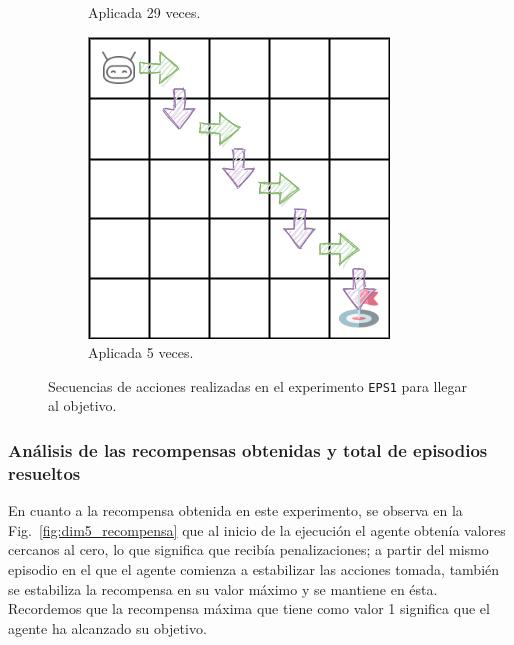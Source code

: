 \begin{figure}
\begin{subfigure}{.5\textwidth}
        \caption{Aplicada 29 veces.}
        \label{fig:dim5_actions_29}
    \end{subfigure}%
    \begin{subfigure}{.5\textwidth}
        \centering
        \includegraphics[scale=0.4]{cap5_experimentacion/images/dim5_actions_5.png}
        \caption{Aplicada 5 veces.}
        \label{fig:dim5_actions_5}
    \end{subfigure}
    \caption{Secuencias de acciones realizadas en el experimento \texttt{EPS1} para llegar al objetivo.}
    \label{fig:dim5_actions}
\end{figure}

\subsubsection{Análisis de las recompensas obtenidas y total de episodios resueltos} 

En cuanto a la recompensa obtenida en este experimento, se observa en la Fig.~\ref{fig:dim5_recompensa} que al inicio de la ejecución el agente obtenía valores cercanos al cero, lo que significa que recibía penalizaciones; a partir del mismo episodio en el que el agente comienza a estabilizar las acciones tomada, también se estabiliza la recompensa en su valor máximo y se mantiene en ésta. Recordemos que la recompensa máxima que tiene como valor 1 significa que el agente ha alcanzado su objetivo.\\
 
